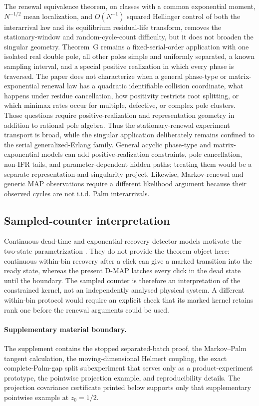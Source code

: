 The renewal equivalence theorem, on classes with a common exponential moment,
\(N^{-1/2}\) mean localization, and \(O(N^{-1})\) squared Hellinger control of
both the interarrival law and its equilibrium residual-life transform, removes
the stationary-window and random-cycle-count difficulty, but it does not
broaden the singular geometry.
Theorem~G remains a fixed-serial-order application with one isolated real
double pole, all other poles simple and uniformly separated, a known sampling
interval, and a special positive realization in which every phase is
traversed.  The paper does not characterize when a general phase-type or
matrix-exponential renewal law has a quadratic identifiable collision
coordinate, what happens under residue cancellation, how positivity
restricts root splitting, or which minimax rates occur for multiple,
defective, or complex pole clusters.  Those questions require
positive-realization and representation geometry in addition to rational
pole algebra.  Thus the stationary-renewal experiment transport is broad,
while the singular application deliberately remains confined to the serial
generalized-Erlang family.  General acyclic phase-type and
matrix-exponential models can add positive-realization constraints, pole
cancellation, non-IFR tails, and parameter-dependent hidden paths; treating
them would be a separate representation-and-singularity project.  Likewise,
Markov-renewal and generic MAP observations require a different likelihood
argument because their observed cycles are not i.i.d. Palm interarrivals.

\subsection{Sampled-counter interpretation}

Continuous dead-time and exponential-recovery detector models motivate the
two-state parametrization
\cite{YuFessler2000,SarbaziSafariHaas2018LongDeadTime,
KrauseWalenta2025SPADRecovery}.  They do not provide the theorem object here:
continuous within-bin recovery after a click can give a marked transition into
the ready state, whereas the present D-MAP latches every click in the dead
state until the boundary.  The sampled counter is therefore an interpretation
of the constrained kernel, not an independently analysed physical system.
A different within-bin protocol would require an explicit check that its
marked kernel retains rank one before the renewal arguments could be used.

\appendix

\label{app:literature-search-protocol-main}
\paragraph{Supplementary material boundary.}
The supplement contains the stopped separated-batch proof, the Markov--Palm
tangent calculation, the moving-dimensional Helmert coupling, the exact
complete-Palm-gap split subexperiment that serves only as a product-experiment
prototype, the pointwise projection example, and
reproducibility details.  The projection covariance certificate printed below
supports only that supplementary pointwise example at \(z_0=1/2\).
